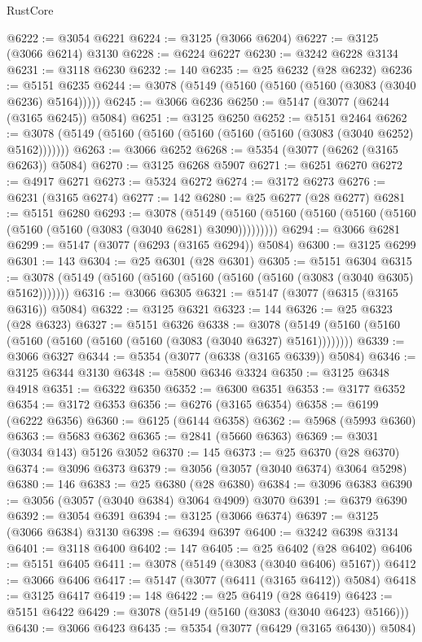 \begin{lexlean}{RustCore}
\begin{coremodule}
@6222 := @3054 @6221
@6224 := @3125 (@3066 @6204)
@6227 := @3125 (@3066 @6214) @3130
@6228 := @6224 @6227
@6230 := @3242 @6228 @3134
@6231 := @3118 @6230
@6232 := 140
@6235 := @25 @6232 (@28 @6232)
@6236 := @5151 @6235
@6244 := @3078 (@5149 (@5160 (@5160 (@5160 (@3083 (@3040 @6236) @5164)))))
@6245 := @3066 @6236
@6250 := @5147 (@3077 (@6244 (@3165 @6245)) @5084)
@6251 := @3125 @6250
@6252 := @5151 @2464
@6262 := @3078 (@5149 (@5160 (@5160 (@5160 (@5160 (@5160 (@3083 (@3040 @6252) @5162)))))))
@6263 := @3066 @6252
@6268 := @5354 (@3077 (@6262 (@3165 @6263)) @5084)
@6270 := @3125 @6268 @5907
@6271 := @6251 @6270
@6272 := @4917 @6271
@6273 := @5324 @6272
@6274 := @3172 @6273
@6276 := @6231 (@3165 @6274)
@6277 := 142
@6280 := @25 @6277 (@28 @6277)
@6281 := @5151 @6280
@6293 := @3078
    (@5149 (@5160 (@5160 (@5160 (@5160 (@5160 (@5160 (@5160 (@3083 (@3040 @6281) @3090)))))))))
@6294 := @3066 @6281
@6299 := @5147 (@3077 (@6293 (@3165 @6294)) @5084)
@6300 := @3125 @6299
@6301 := 143
@6304 := @25 @6301 (@28 @6301)
@6305 := @5151 @6304
@6315 := @3078 (@5149 (@5160 (@5160 (@5160 (@5160 (@5160 (@3083 (@3040 @6305) @5162)))))))
@6316 := @3066 @6305
@6321 := @5147 (@3077 (@6315 (@3165 @6316)) @5084)
@6322 := @3125 @6321
@6323 := 144
@6326 := @25 @6323 (@28 @6323)
@6327 := @5151 @6326
@6338 := @3078 (@5149 (@5160 (@5160 (@5160 (@5160 (@5160 (@5160 (@3083 (@3040 @6327) @5161))))))))
@6339 := @3066 @6327
@6344 := @5354 (@3077 (@6338 (@3165 @6339)) @5084)
@6346 := @3125 @6344 @3130
@6348 := @5800 @6346 @3324
@6350 := @3125 @6348 @4918
@6351 := @6322 @6350
@6352 := @6300 @6351
@6353 := @3177 @6352
@6354 := @3172 @6353
@6356 := @6276 (@3165 @6354)
@6358 := @6199 (@6222 @6356)
@6360 := @6125 (@6144 @6358)
@6362 := @5968 (@5993 @6360)
@6363 := @5683 @6362
@6365 := @2841 (@5660 @6363)
@6369 := @3031 (@3034 @143) @5126 @3052
@6370 := 145
@6373 := @25 @6370 (@28 @6370)
@6374 := @3096 @6373
@6379 := @3056 (@3057 (@3040 @6374) @3064 @5298)
@6380 := 146
@6383 := @25 @6380 (@28 @6380)
@6384 := @3096 @6383
@6390 := @3056 (@3057 (@3040 @6384) @3064 @4909) @3070
@6391 := @6379 @6390
@6392 := @3054 @6391
@6394 := @3125 (@3066 @6374)
@6397 := @3125 (@3066 @6384) @3130
@6398 := @6394 @6397
@6400 := @3242 @6398 @3134
@6401 := @3118 @6400
@6402 := 147
@6405 := @25 @6402 (@28 @6402)
@6406 := @5151 @6405
@6411 := @3078 (@5149 (@3083 (@3040 @6406) @5167))
@6412 := @3066 @6406
@6417 := @5147 (@3077 (@6411 (@3165 @6412)) @5084)
@6418 := @3125 @6417
@6419 := 148
@6422 := @25 @6419 (@28 @6419)
@6423 := @5151 @6422
@6429 := @3078 (@5149 (@5160 (@3083 (@3040 @6423) @5166)))
@6430 := @3066 @6423
@6435 := @5354 (@3077 (@6429 (@3165 @6430)) @5084)

\end{coremodule}
\end{lexlean}
